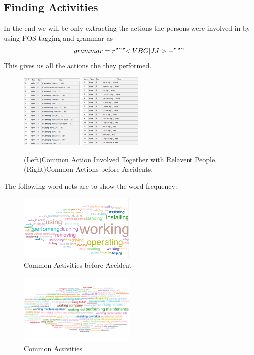 \documentclass[DIV=calc, paper=a4, fontsize=11pt, twocolumn]{scrartcl}	 %
\begin{document}
\subsection{Finding Activities}
In the end we will be only extracting the actions the persons were involved in by using
POS tagging and grammar as
$$grammar = r"""{<VBG|JJ>+}"""$$
This gives us all the actions the they performed.


\begin{figure}%
    \centering
    \includegraphics[width=3cm]{q41.png}
    \includegraphics[width=3cm]{q42.png}
    \caption{(Left)Common Action Involved Together with Relavent
      People. (Right)Common Actions before Accidents.}%
\end{figure}


The following word nets are to show the word frequency:

\begin{figure}[h!]
  \centering
      \includegraphics[width=0.5\textwidth]{bef_acc.png}
   \caption{Common Activities before Accident}
\end{figure}


\begin{figure}[h!]
  \centering
      \includegraphics[width=0.5\textwidth]{act.png}
   \caption{Common Activities}
\end{figure}
\end{document}
